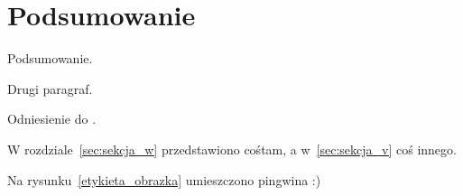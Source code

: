 
\chapter{Podsumowanie}
\label{chapter:end}

Podsumowanie.

Drugi paragraf.

Odniesienie do \cite{some_thesis}.

W rozdziale~\ref{sec:sekcja_w} przedstawiono cośtam, a w~\ref{sec:sekcja_v} coś innego.

Na rysunku~\ref{etykieta_obrazka} umieszczono pingwina :)
